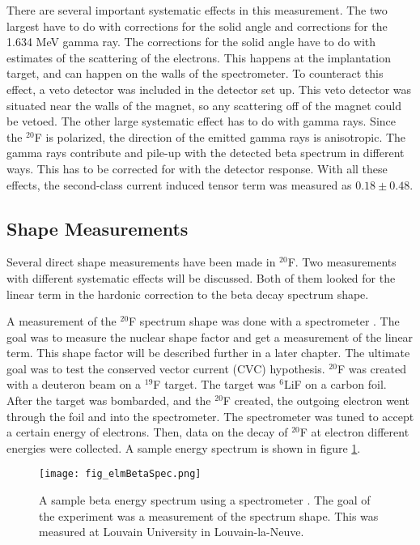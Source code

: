 \documentclass[../MaxHughesThesis.tex]{subfiles}
\begin{document}
There are several important systematic effects in this measurement.
The two largest have to do with corrections for the solid angle and corrections for the 1.634 MeV gamma ray.
The corrections for the solid angle have to do with estimates of the scattering of the electrons.
This happens at the implantation target, and can happen on the walls of the spectrometer.
To counteract this effect, a veto detector was included in the detector set up. 
This veto detector was situated near the walls of the magnet, so any scattering off of the magnet could be vetoed. 
The other large systematic effect has to do with gamma rays.
Since the $^{20}$F is polarized, the direction of the emitted gamma rays is anisotropic.
The gamma rays contribute and pile-up with the detected beta spectrum in different ways.
This has to be corrected for with the detector response.
With all these effects, the second-class current induced tensor term was measured as $0.18 \pm 0.48$. 

\subsection{Shape Measurements} 

Several direct shape measurements have been made in $^{20}$F.
Two measurements with different systematic effects will be discussed.
Both of them looked for the linear term in the hardonic correction to the beta decay spectrum shape. 

A measurement of the $^{20}$F spectrum shape was done with a spectrometer \cite{Elm87}.
The goal was to measure the nuclear shape factor and get a measurement of the linear term.
This shape factor will be described further in a later chapter.
The ultimate goal was to test the conserved vector current (CVC) hypothesis. 
$^{20}$F was created with a deuteron beam on a $^{19}$F target.
The target was $^{6}$LiF on a carbon foil.
After the target was bombarded, and the $^{20}$F created, the outgoing electron went through the foil and into the spectrometer.
The spectrometer was tuned to accept a certain energy of electrons. 
Then, data on the decay of $^{20}$F at electron different energies were collected.
A sample energy spectrum is shown in figure \ref{fig:elmspec}.

\begin{figure}[!htb]
	\centerline{\texttt{[image: fig\_elmBetaSpec.png]}}
	\caption{A sample beta energy spectrum using a spectrometer \cite{Elm87}.
		 The goal of the experiment was a measurement of the spectrum shape.
		 This was measured at Louvain University in Louvain-la-Neuve.
		 }
	\label{fig:elmspec}
\end{figure}
\end{document}
